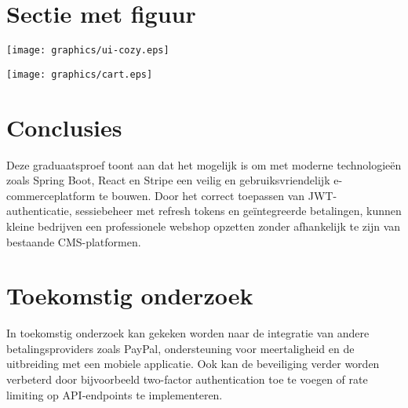 \documentclass[a0,portrait]{hogent-poster}
\begin{document}
\begin{multicols}{2}
\section{Sectie met figuur}


\begin{center}
  \captionsetup{type=figure}
  \texttt{[image: graphics/ui-cozy.eps]}
\end{center}
\begin{center}
  \captionsetup{type=figure}
  \texttt{[image: graphics/cart.eps]}
\end{center}



\section{Conclusies}

Deze graduaatsproef toont aan dat het mogelijk is om met moderne technologieën zoals Spring Boot, React en Stripe een veilig en gebruiksvriendelijk e-commerceplatform te bouwen. Door het correct toepassen van JWT-authenticatie, sessiebeheer met refresh tokens en geïntegreerde betalingen, kunnen kleine bedrijven een professionele webshop opzetten zonder afhankelijk te zijn van bestaande CMS-platformen.

\section{Toekomstig onderzoek}

In toekomstig onderzoek kan gekeken worden naar de integratie van andere betalingsproviders zoals PayPal, ondersteuning voor meertaligheid en de uitbreiding met een mobiele applicatie. Ook kan de beveiliging verder worden verbeterd door bijvoorbeeld two-factor authentication toe te voegen of rate limiting op API-endpoints te implementeren. 

\end{multicols}
\end{document}
